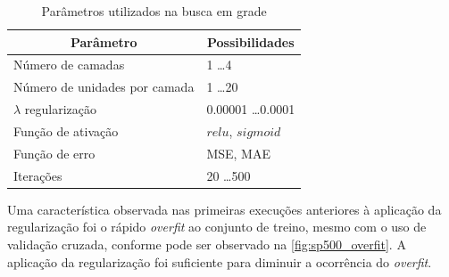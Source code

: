 \documentclass[
    12pt,
    oneside,
    a4paper,
    english,
    brazil
]{abntex2}
\begin{document}
\begin{table}[ht]
\centering
\caption{Parâmetros utilizados na busca em grade}\label{tab:gridsearch}
\begin{tabular}{l l}
\multicolumn{1}{c}{Parâmetro}        & \multicolumn{1}{c}{Possibilidades}  \\
    \toprule
    Número de camadas                & 1 \ldots 4                          \\
    Número de unidades por camada    & 1 \ldots 20                         \\
    $\lambda$ regularização          & 0.00001 \ldots 0.0001               \\
    Função de ativação               & $relu$, $sigmoid$                   \\
    Função de erro                   & MSE, MAE                            \\
    Iterações                        & 20 \ldots 500
\end{tabular}
\end{table}

Uma  característica observada  nas primeiras  execuções anteriores  à aplicação
da  regularização  foi  o  rápido   \textit{overfit}  ao  conjunto  de  treino,
mesmo  com  o  uso  de  validação  cruzada,  conforme  pode  ser  observado  na
\autoref{fig:sp500_overfit}. A  aplicação da regularização foi  suficiente para
diminuir a ocorrência do \textit{overfit}.
\end{document}
